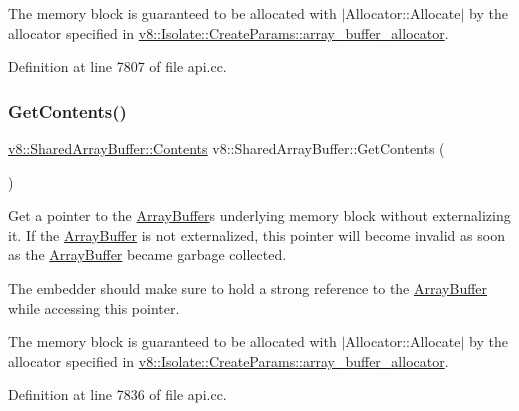 The memory block is guaranteed to be allocated with $\vert$\+Allocator\+::\+Allocate$\vert$ by the allocator specified in \mbox{\hyperlink{structv8_1_1Isolate_1_1CreateParams_a7c663f70b64290392eeaf164f57585f9}{v8\+::\+Isolate\+::\+Create\+Params\+::array\+\_\+buffer\+\_\+allocator}}. 

Definition at line 7807 of file api.\+cc.

\mbox{\label{classv8_1_1SharedArrayBuffer_a7267c4156bea02154afa6c8fc5b1f4d8}} 
\subsubsection{\texorpdfstring{Get\+Contents()}{GetContents()}}
{\footnotesize\ttfamily \mbox{\hyperlink{classv8_1_1SharedArrayBuffer_1_1Contents}{v8\+::\+Shared\+Array\+Buffer\+::\+Contents}} v8\+::\+Shared\+Array\+Buffer\+::\+Get\+Contents (\begin{DoxyParamCaption}{ }\end{DoxyParamCaption})}

Get a pointer to the \mbox{\hyperlink{classv8_1_1ArrayBuffer}{Array\+Buffer}}\textquotesingle{}s underlying memory block without externalizing it. If the \mbox{\hyperlink{classv8_1_1ArrayBuffer}{Array\+Buffer}} is not externalized, this pointer will become invalid as soon as the \mbox{\hyperlink{classv8_1_1ArrayBuffer}{Array\+Buffer}} became garbage collected.

The embedder should make sure to hold a strong reference to the \mbox{\hyperlink{classv8_1_1ArrayBuffer}{Array\+Buffer}} while accessing this pointer.

The memory block is guaranteed to be allocated with $\vert$\+Allocator\+::\+Allocate$\vert$ by the allocator specified in \mbox{\hyperlink{structv8_1_1Isolate_1_1CreateParams_a7c663f70b64290392eeaf164f57585f9}{v8\+::\+Isolate\+::\+Create\+Params\+::array\+\_\+buffer\+\_\+allocator}}. 

Definition at line 7836 of file api.\+cc.

\mbox{\label{classv8_1_1SharedArrayBuffer_adcbceac6432955c7d54fceea27c92b73}} 
